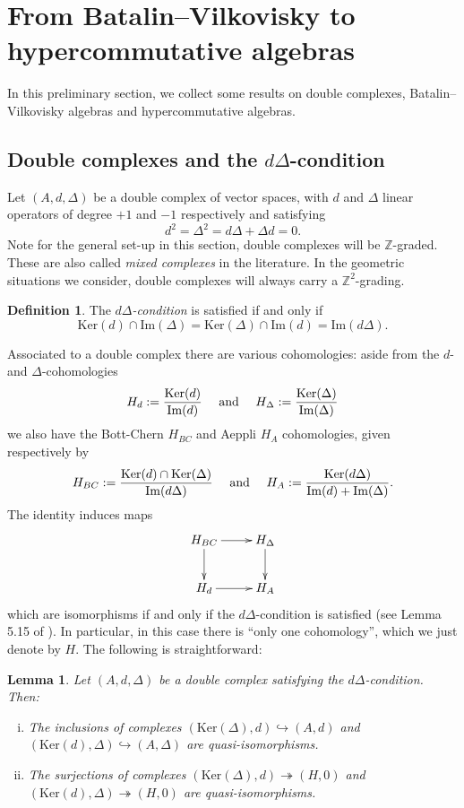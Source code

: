 \documentclass[a4paper]{amsart}
\newtheorem{lemm}[theo]{Lemma}
\theoremstyle{definition}
\newtheorem{defi}[theo]{Definition}
\theoremstyle{theorem}
\newcommand{\ZZ}{\mathbb{Z}}
\newcommand{\Ker}{\mathrm{Ker}}
\newcommand{\Img}{\mathrm{Im}}
\begin{document}
\section{From Batalin--Vilkovisky to hypercommutative algebras}\label{secBV}
In this preliminary section, we collect some results on double complexes, Batalin--Vilkovisky algebras and hypercommutative algebras.


\subsection{Double complexes and the $d\Delta$-condition}
Let $(A,d,\Delta)$ be a double complex of vector spaces, with $d$ and $\Delta$ linear operators of degree $+1$ and $-1$ respectively and satisfying 
\[d^2=\Delta^2=d\Delta+\Delta d=0.\]
Note for the general set-up in this section, double complexes will be $\ZZ$-graded. These are also called \textit{mixed complexes} in the literature. In the geometric situations we consider, double complexes will always carry a $\ZZ^2$-grading.

\begin{defi}
The  \textit{$d\Delta$-condition} is satisfied if and only if
\[\Ker(d)\cap \Img(\Delta)=\Ker(\Delta)\cap\Img(d)=\Img(d\Delta).\]
\end{defi}

Associated to a double complex there are various cohomologies:
aside from the $d$- and $\Delta$-cohomologies
\[H_d:={{\Ker(d)}\over{\Img(d)}}\quad\text{ and }\quad H_\Delta:={{\Ker(\Delta)}\over{\Img(\Delta)}}\]
we also have the Bott-Chern $H_{BC}$ and Aeppli $H_A$ cohomologies, given respectively by
\[H_{BC}:={{\Ker(d)\cap \Ker(\Delta)}\over{\Img(d\Delta) }}\quad\text{ and }\quad
H_{A}:={{\Ker(d \Delta)}\over{\Img(d)+\Img(\Delta)}}.\]
The identity induces maps 
\[\xymatrix{
H_{BC}\ar[d]\ar[r]&H_\Delta\ar[d]\\
H_d\ar[r]&H_A
}\]
which are isomorphisms if and only if the $d\Delta$-condition is satisfied (see Lemma 5.15 of \cite{DGMS}). 
In particular, in this case there is ``only one cohomology'', which we just denote by $H$.
The following is straightforward:
\begin{lemm}\label{quises}Let $(A,d,\Delta)$ be a double complex satisfying the $d\Delta$-condition. Then:
  \begin{enumerate}[(i)]
  \item The inclusions of complexes $(\Ker(\Delta),d)\hookrightarrow (A,d)$ and $(\Ker(d),\Delta)\hookrightarrow (A,\Delta)$ are quasi-isomorphisms.
   \item The surjections of complexes $(\Ker(\Delta),d)\twoheadrightarrow (H,0)$ and $(\Ker(d),\Delta)\twoheadrightarrow (H,0)$
are quasi-isomorphisms.
 \end{enumerate}
\end{lemm}
\end{document}
